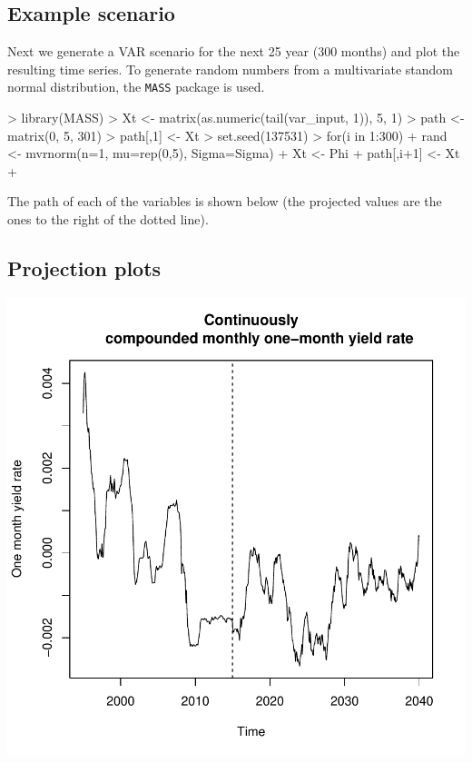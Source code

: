 \documentclass[11pt]{article}
\begin{document}
\subsection{Example scenario}
Next we generate a VAR scenario for the next 25 year (300 months) and plot
the resulting time series. To generate random numbers from a multivariate standom
normal distribution, the \texttt{MASS} package is used.
\begin{Schunk}
\begin{Sinput}
> library(MASS)
> Xt <- matrix(as.numeric(tail(var_input, 1)), 5, 1)
> path <- matrix(0, 5, 301)
> path[,1] <- Xt
> set.seed(137531)
> for(i in 1:300) {
+     rand <- mvrnorm(n=1, mu=rep(0,5), Sigma=Sigma)
+     Xt <- Phi %
+     path[,i+1] <- Xt 
+ }
\end{Sinput}
\end{Schunk}

The path of each of the variables is shown below (the projected values are the ones 
to the right of the dotted line).

\subsection{Projection plots}
\begin{Schunk}
\end{Schunk}
\includegraphics{var_canada_summary-008}
\end{document}
